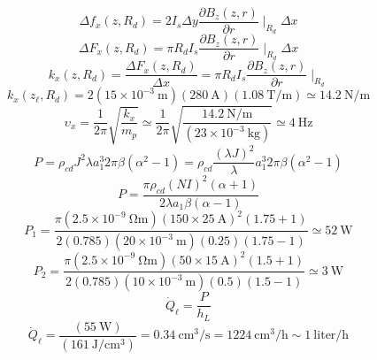 \begin{equation}%
\Delta f_x(z,R_d)=2I_s\Delta y\frac{\partial B_z(z,r)}{\partial r}\mid_{R_d}\Delta x
\end{equation}
\begin{equation}%
\Delta F_x(z,R_d)=\pi R_dI_s\frac{\partial B_z(z,r)}{\partial r}\mid_{R_d}\Delta x
\end{equation}
\begin{equation}%
k_x(z,R_d)=\frac{\Delta F_x(z,R_d)}{\Delta x}=\pi R_dI_s\frac{\partial B_z(z,r)}{\partial r}\mid_{R_d}
\end{equation}
\begin{equation}%
k_x(z_\ell,R_d)=2(15\times 10^{-3}\ \mathrm{m})(280\ \mathrm{A})(1.08\ \mathrm{T/m})\simeq 14.2\ \mathrm{N/m}
\end{equation}
\begin{equation}%
\upsilon_x=\frac{1}{2\pi}\sqrt{\frac{k_x}{m_p}} 
\simeq\frac{1}{2\pi}\sqrt{\frac{14.2\ \mathrm{N/m}}{(23\times 10^{-3}\ \mathrm{kg})}}\simeq 4\ \mathrm{Hz}
\end{equation}
\begin{equation}%
P=\rho_{cd}J^2\lambda a_{1}^{3}2\pi\beta(\alpha^2-1) 
=\rho_{cd}\frac{(\lambda J)^2}{\lambda}a_{1}^{3}2\pi\beta(\alpha^2-1)
\end{equation}
\begin{equation}%
P=\frac{\pi\rho_{cd}(NI)^2(\alpha+1)}{2\lambda a_1\beta(\alpha-1)}
\end{equation}
\begin{equation}%
P_1=\frac{\pi(2.5\times 10^{-9}\ \mathrm{\Omega m})(150\times 25\ \mathrm{A})^2(1.75+1)}{2(0.785)(20\times 10^{-3}\ \mathrm{m})(0.25)(1.75-1)}\simeq 52\ \mathrm{W}
\end{equation}
\begin{equation}%
P_2=\frac{\pi(2.5\times 10^{-9}\ \mathrm{\Omega m})(50\times 15\ \mathrm{A})^2(1.5+1)}{2(0.785)(10\times 10^{-3}\ \mathrm{m})(0.5)(1.5-1)}\simeq 3\ \mathrm{W}
\end{equation}
\begin{equation}%
\dot{Q}_\ell=\frac{P}{h_L}
\end{equation}
\begin{equation}%
\dot{Q}_\ell=\frac{(55\ \mathrm{W})}{(161\ \mathrm{J/cm^3})}=0.34\ \mathrm{cm^3/s}=1224\ \mathrm{cm^3/h} 
\sim 1\ \mathrm{liter/h}
\end{equation}

